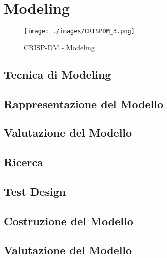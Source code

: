 \chapter{Modeling}

\begin{figure}[hbtp]
	\centering
	\texttt{[image: ./images/CRISPDM\_3.png]}
	\caption{CRISP-DM - Modeling}
	\label{CRISPDM_4}
\end{figure}

\section{Tecnica di Modeling}

\section{Rappresentazione del Modello}

\section{Valutazione del Modello}

\section{Ricerca}

\section{Test Design}

\section{Costruzione del Modello}

\section{Valutazione del Modello}

